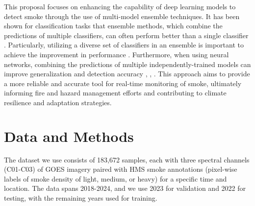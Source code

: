 \documentclass{article}
\begin{document}
This proposal focuses on enhancing the capability of deep learning models to detect smoke through the use of multi-model ensemble techniques. It has been shown for classification tasks that ensemble methods, which combine the predictions of multiple classifiers, can often perform better than a single classifier \citep{ensemble-ml}. Particularly, utilizing a diverse set of classifiers in an ensemble is important to achieve the improvement in performance \citep{ensemble-diversity}. Furthermore, when using neural networks, combining the predictions of multiple independently-trained models can improve generalization and detection accuracy \citep{nn-ensemble}, \citep{nn-ensemble2}, \citep{nn-error-ens}. This approach aims to provide a more reliable and accurate tool for real-time monitoring of smoke, ultimately informing fire and hazard management efforts and contributing to climate resilience and adaptation strategies.
\section{Data and Methods}
The dataset we use consists of 183,672 samples, each with three spectral channels (C01-C03) of GOES imagery paired with HMS smoke annotations (pixel-wise labels of smoke density of light, medium, or heavy) for a specific time and location. The data spans 2018-2024, and we use 2023 for validation and 2022 for testing, with the remaining years used for training. 
\end{document}
